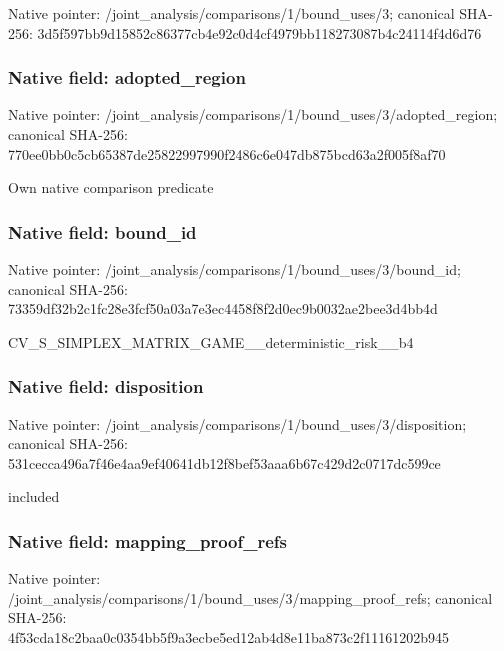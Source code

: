 \documentclass[10pt,a4paper]{article}
\begin{document}
Native pointer: /joint\_analysis/comparis\allowbreak{}ons/1/bound\_uses/3; canonical SHA-256: 3d5f597bb9d15852c86377cb\allowbreak{}4e92c0d4cf4979bb11827308\allowbreak{}7b4c24114f4d6d76



\subsubsection{Native field: adopted\_region}


Native pointer: /joint\_analysis/comparis\allowbreak{}ons/1/bound\_uses/3/adopt\allowbreak{}ed\_region; canonical SHA-256: 770ee0bb0c5cb65387de2582\allowbreak{}2997990f2486c6e047db875b\allowbreak{}cd63a2f005f8af70


Own native comparison predicate


\subsubsection{Native field: bound\_id}


Native pointer: /joint\_analysis/comparis\allowbreak{}ons/1/bound\_uses/3/bound\allowbreak{}\_id; canonical SHA-256: 73359df32b2c1fc28e3fcf50\allowbreak{}a03a7e3ec4458f8f2d0ec9b0\allowbreak{}032ae2bee3d4bb4d


CV\_S\_SIMPLEX\_MATRIX\_GAME\allowbreak{}\_\_deterministic\_risk\_\_b4


\subsubsection{Native field: disposition}


Native pointer: /joint\_analysis/comparis\allowbreak{}ons/1/bound\_uses/3/dispo\allowbreak{}sition; canonical SHA-256: 531cecca496a7f46e4aa9ef4\allowbreak{}0641db12f8bef53aaa6b67c4\allowbreak{}29d2c0717dc599ce


included


\subsubsection{Native field: mapping\_proof\_refs}


Native pointer: /joint\_analysis/comparis\allowbreak{}ons/1/bound\_uses/3/mappi\allowbreak{}ng\_proof\_refs; canonical SHA-256: 4f53cda18c2baa0c0354bb5f\allowbreak{}9a3ecbe5ed12ab4d8e11ba87\allowbreak{}3c2f11161202b945
\end{document}
